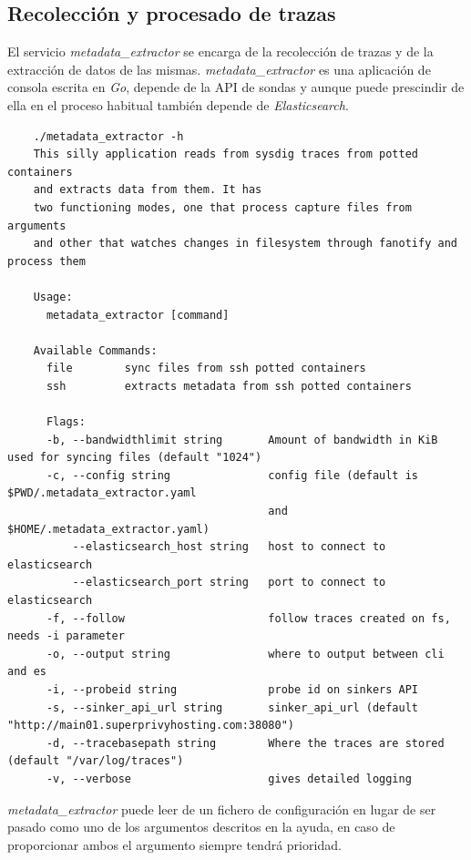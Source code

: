 \subsection{Recolección y procesado de trazas}
\label{subsec:extraccion-trazas}

El servicio \emph{metadata\_extractor} se encarga de la recolección de trazas y de la extracción de datos de las mismas.
\emph{metadata\_extractor} es una aplicación de consola escrita en \emph{Go}, depende de la API de sondas y aunque puede prescindir de ella
en el proceso habitual también depende de \emph{Elasticsearch}.

\begin{verbatim}
    ./metadata_extractor -h
    This silly application reads from sysdig traces from potted containers 
    and extracts data from them. It has
    two functioning modes, one that process capture files from arguments 
    and other that watches changes in filesystem through fanotify and process them
    
    Usage:
      metadata_extractor [command]
    
    Available Commands:
      file        sync files from ssh potted containers
      ssh         extracts metadata from ssh potted containers
    
      Flags:
      -b, --bandwidthlimit string       Amount of bandwidth in KiB used for syncing files (default "1024")
      -c, --config string               config file (default is $PWD/.metadata_extractor.yaml 
                                        and $HOME/.metadata_extractor.yaml)
          --elasticsearch_host string   host to connect to elasticsearch
          --elasticsearch_port string   port to connect to elasticsearch
      -f, --follow                      follow traces created on fs, needs -i parameter
      -o, --output string               where to output between cli and es
      -i, --probeid string              probe id on sinkers API
      -s, --sinker_api_url string       sinker_api_url (default "http://main01.superprivyhosting.com:38080")
      -d, --tracebasepath string        Where the traces are stored  (default "/var/log/traces")
      -v, --verbose                     gives detailed logging
\end{verbatim}
\bigskip
\emph{metadata\_extractor} puede leer de un fichero de configuración en lugar de ser pasado como uno de los argumentos descritos en la ayuda, en caso
de proporcionar ambos el argumento siempre tendrá prioridad.



